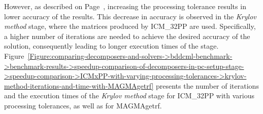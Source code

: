 However, as described on Page~\pageref{Text:comparing-decomposers-and-solvers->decomposition-project-benchmarks->decomposers-benchmark->accuracy-of-results-on-all-matrices->double-precision->ICM32PP->various-processing-tolerances->description-of-figure-with-accuracy-results}, increasing the processing tolerance results in lower accuracy of the results.
This decrease in accuracy is observed in the \textit{Krylov method} stage, where the matrices produced by ICM\_32PP are used.
Specifically, a higher number of iterations are needed to achieve the desired accuracy of the solution, consequently leading to longer execution times of the stage.
Figure~\ref{Figure:comparing-decomposers-and-solvers->bddcml-benchmark->benchmark-results->speedup-comparison-of-decomposers-in-pc-setup-stage->speedup-comparison->ICMxPP-with-varying-processing-tolerances->krylov-method-iterations-and-time-with-MAGMAgetrf} presents the number of iterations and the execution times of the \textit{Krylov method} stage for ICM\_32PP with various processing tolerances, as well as for MAGMAgetrf.

